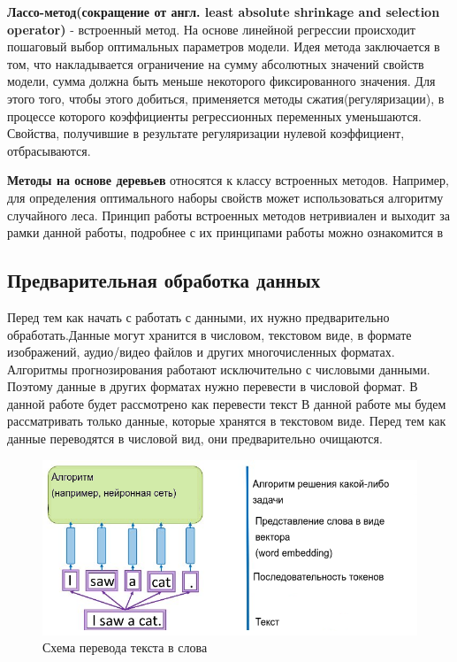 \textbf{Лассо-метод(сокращение от англ. least absolute shrinkage and selection operator)} - встроенный метод. На основе линейной регрессии происходит пошаговый выбор оптимальных параметров модели.  Идея метода заключается в том, что накладывается ограничение на сумму абсолютных значений свойств модели, сумма должна быть меньше некоторого фиксированного значения. Для этого того, чтобы этого добиться, применяется методы сжатия(регуляризации), в процессе которого коэффициенты регрессионных переменных уменьшаются. Свойства, получившие в результате регуляризации нулевой коэффициент, отбрасываются.

\textbf{Методы на основе деревьев} относятся к классу встроенных методов. Например, для определения оптимального наборы свойств может использоваться алгоритму случайного леса. Принцип работы встроенных методов нетривиален и выходит за рамки данной работы, подробнее с их принципами работы можно ознакомится в \cite{Book15}
\subsection{Предварительная обработка данных}

Перед тем как начать с работать с данными, их нужно предварительно обработать.Данные могут хранится в числовом, текстовом виде, в формате изображений, аудио/видео файлов и других многочисленных форматах. Алгоритмы прогнозирования работают исключительно с числовыми данными. Поэтому данные в других форматах нужно перевести в числовой формат. В данной работе будет рассмотрено как перевести текст В данной работе мы будем рассматривать только данные, которые хранятся в текстовом виде. 
Перед тем как данные переводятся в числовой вид, они предварительно очищаются. 


\begin{figure}[!h]
	\centering
	\includegraphics[width=.5\textwidth]{master_img/learning-word-representations_edited.png}
	\caption{Схема перевода текста в слова}
	\label{fig01_master}
\end{figure}

